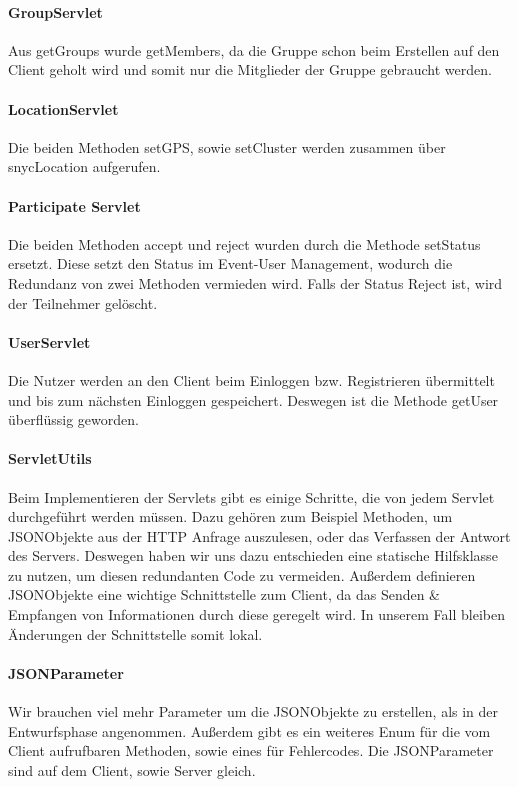 \documentclass{scrartcl}
\begin{document}
	\paragraph{GroupServlet}
	Aus getGroups wurde getMembers, da die Gruppe schon beim Erstellen auf den Client geholt wird und somit nur die Mitglieder der Gruppe gebraucht werden.
	
	\paragraph{LocationServlet}
	Die beiden Methoden setGPS, sowie setCluster werden zusammen über snycLocation aufgerufen. %
	
	\paragraph{Participate Servlet}
	Die beiden Methoden accept und reject wurden durch die Methode setStatus ersetzt. Diese setzt den Status im Event-User Management, wodurch die Redundanz von zwei Methoden vermieden wird. Falls der Status Reject ist, wird der Teilnehmer gelöscht. 
	
	\paragraph{UserServlet}
	Die Nutzer werden an den Client beim Einloggen bzw. Registrieren übermittelt und bis zum nächsten Einloggen gespeichert. Deswegen ist die Methode getUser überflüssig geworden.
	
	\paragraph{ServletUtils}
	Beim Implementieren der Servlets gibt es einige Schritte, die von jedem Servlet durchgeführt werden müssen. Dazu gehören zum Beispiel Methoden, um JSONObjekte aus der HTTP Anfrage auszulesen, oder das Verfassen der Antwort des Servers.
	Deswegen haben wir uns dazu entschieden eine statische Hilfsklasse zu nutzen, um diesen redundanten Code zu vermeiden. Außerdem definieren JSONObjekte eine wichtige Schnittstelle zum Client, da das Senden \& Empfangen von Informationen durch diese geregelt wird. In unserem Fall bleiben Änderungen der Schnittstelle somit lokal.
	
	\paragraph{JSONParameter}
	Wir brauchen viel mehr Parameter um die JSONObjekte zu erstellen, als in der Entwurfsphase angenommen. Außerdem gibt es ein weiteres Enum für die vom Client aufrufbaren Methoden, sowie eines für Fehlercodes. Die JSONParameter sind auf dem Client, sowie Server gleich. 
		
\end{document}
